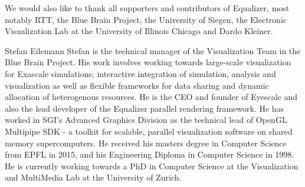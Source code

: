 \documentclass[10pt,journal,compsoc]{IEEEtran}
\begin{document}
We would also like to thank all supporters and contributors of
\textsf{Equalizer}, most notably RTT, the Blue Brain Project, the University of
Siegen, the Electronic Visualization Lab at the University of Illinois Chicago
and Dardo Kleiner.


%

\begin{IEEEbiography}{
Stefan Eilemann} Stefan is the technical manager of the Visualization Team in
the Blue
Brain Project. His work involves working towards large-scale visualization for
Exascale simulations; interactive integration of simulation, analysis and
visualization as well as flexible frameworks for data sharing and dynamic
allocation of heterogenous resources. He is the CEO and founder of Eyescale and
also the lead developer of the \textsf{Equalizer} parallel rendering framework.
He has worked in SGI's Advanced Graphics Division as the technical lead of
OpenGL Multipipe SDK - a toolkit for scalable, parallel visualization software
on shared memory supercomputers. He received his masters degree in Computer
Science from EPFL in 2015, and his Engineering Diploma in Computer Science in
1998. He is currently working towards a PhD in Computer Science at the
Visualization and MultiMedia Lab at the University of Zurich.
\end{IEEEbiography}
\end{document}
